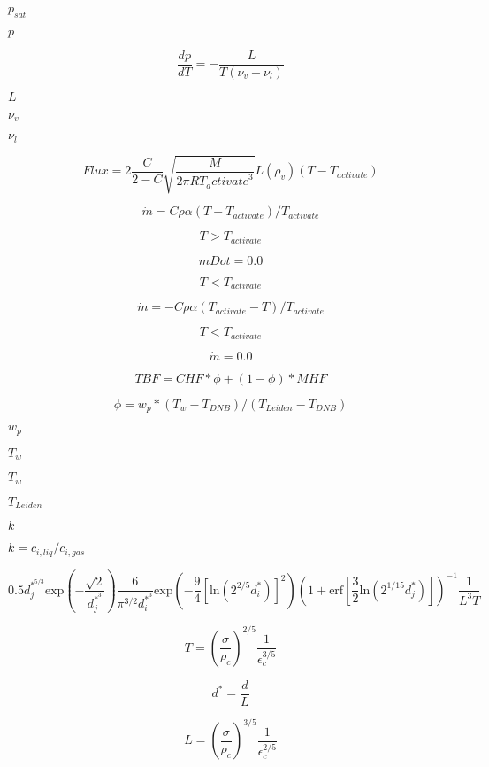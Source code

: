 \documentclass{article}
\begin{document}
$            p_{sat} $
\pagebreak

$            p       $
\pagebreak

\[
        \frac{dp}{dT} = - \frac{L}{T (\nu_v - \nu_l)}
    \]
\pagebreak

$            L       $
\pagebreak

$            \nu_v   $
\pagebreak

$            \nu_l   $
\pagebreak

\[
        Flux =
           2 \frac{C}{2 - C}
           \sqrt{\frac{M}{2 \pi R {T_activate}^3}} L (\rho_{v})
           (T - T_{activate})
    \]
\pagebreak

\[
    \dot{m} = C \rho \alpha (T - T_{activate})/T_{activate}
\]
\pagebreak

\[ T > T_{activate} \]
\pagebreak

\[ mDot = 0.0 \]
\pagebreak

\[  T < T_{activate} \]
\pagebreak

\[
    \dot{m} = -C \rho \alpha (T_{activate} - T)/T_{activate}
\]
\pagebreak

\[ T < T_{activate} \]
\pagebreak

\[ \dot{m} = 0.0 \]
\pagebreak

\[
    TBF = CHF*\phi + (1 - \phi)*MHF
\]
\pagebreak

\[
    \phi = w_p*(T_w - T_{DNB})/(T_{Leiden} - T_{DNB})
\]
\pagebreak

$        w_p $
\pagebreak

$        T_w $
\pagebreak

$T_w$
\pagebreak

$T_{Leiden}$
\pagebreak

$k$
\pagebreak

$k =
c_{i,liq}/c_{i,gas}$
\pagebreak

\[
    0.5 d_j^{*^{5/3}} \mathrm{exp}\left(-\frac{\sqrt{2}}{d_j^{*^{3}}}\right)
    \frac{6}{\pi^{3/2}d_i^{*^{3}}}
    \mathrm{exp}
    \left(
      - \frac{9}{4}\left[\mathrm{ln}\left(2^{2/5} d_i^{*}\right)\right]^{2}
    \right)
    \left(
        1
      + \mathrm{erf}
        \left[
            \frac{3}{2}\mathrm{ln} \left(2^{1/15} d_j^{*}\right)
        \right]
    \right)^{-1}
    \frac{1}{L^{3}T}
\]
\pagebreak

\[
    T = \left(\frac{\sigma}{\rho_c}\right)^{2/5} \frac{1}{\epsilon_c^{3/5}}
\]
\pagebreak

\[
    d^{*} = \frac{d}{L}
\]
\pagebreak

\[
    L = \left(\frac{\sigma}{\rho_c}\right)^{3/5} \frac{1}{\epsilon_c^{2/5}}
\]
\pagebreak
\end{document}
